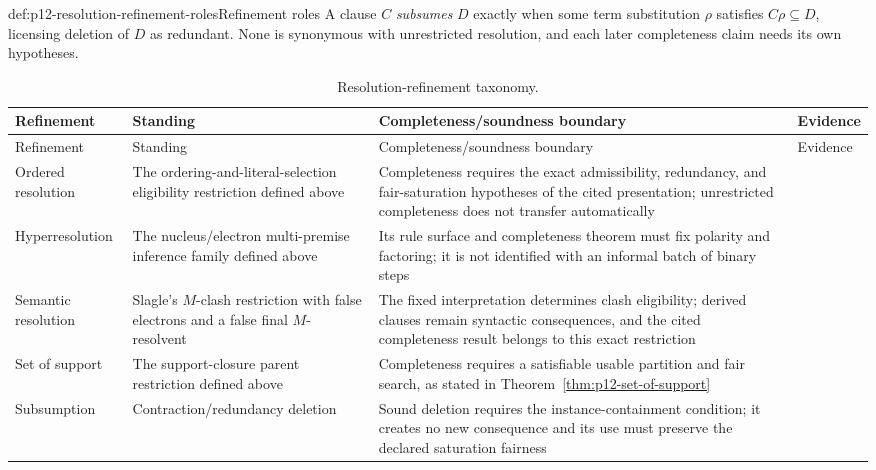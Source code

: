 \begin{hbdefinition}{def:p12-resolution-refinement-roles}{Refinement roles}
A clause \(C\) \emph{subsumes} \(D\) exactly
when some term substitution \(\rho\) satisfies \(C\rho\subseteq D\), licensing
deletion of \(D\) as redundant.  None is synonymous with unrestricted
resolution, and each later completeness claim needs its own hypotheses.
\end{hbdefinition}

\begin{longtable}{@{}p{}p{}p{}p{}@{}}
\caption{Resolution-refinement taxonomy.}
\label{tab:p12-resolution-refinements}\\
\toprule
Refinement & Standing & Completeness/soundness boundary & Evidence \\ \midrule
\endfirsthead
\toprule
Refinement & Standing & Completeness/soundness boundary & Evidence \\ \midrule
\endhead
Ordered resolution & The ordering-and-literal-selection eligibility
restriction defined above & Completeness requires the exact admissibility,
redundancy, and fair-saturation hypotheses of the cited presentation;
unrestricted completeness does not transfer automatically &
\cite{BachmairGanzinger2001} \\ \addlinespace
Hyperresolution & The nucleus/electron multi-premise inference family defined
above & Its rule surface and completeness theorem must fix polarity and
factoring; it is not identified with an informal batch of binary steps &
\cite{Robinson1965} \\ \addlinespace
Semantic resolution & Slagle's \(M\)-clash restriction with false electrons
and a false final \(M\)-resolvent & The fixed interpretation determines clash
eligibility; derived clauses remain syntactic consequences, and the cited
completeness result belongs to this exact restriction &
\cite{Slagle1967} \\ \addlinespace
Set of support & The support-closure parent restriction defined above &
Completeness requires a satisfiable usable partition and fair search, as stated
in Theorem~\ref{thm:p12-set-of-support} &
\cite{WosRobinsonCarson1965} \\ \addlinespace
Subsumption & Contraction/redundancy deletion & Sound deletion requires the
instance-containment condition; it creates no new consequence and its use must
preserve the declared saturation fairness & \cite{BachmairGanzinger2001} \\
\bottomrule
\end{longtable}

